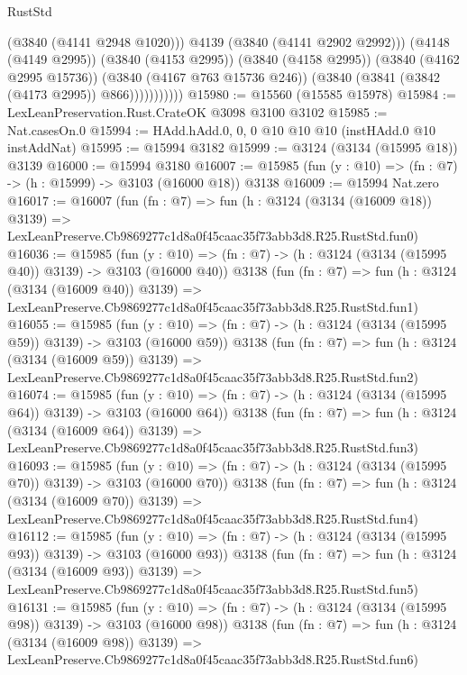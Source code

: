 \begin{lexlean}{RustStd}
\begin{coremodule}
                          (@3840 (@4141 @2948 @1020)))
                        @4139
                        (@3840 (@4141 @2902 @2992)))
                      (@4148 (@4149 @2995))
                      (@3840 (@4153 @2995))
                      (@3840 (@4158 @2995))
                      (@3840 (@4162 @2995 @15736))
                      (@3840 (@4167 @763 @15736 @246))
                      (@3840 (@3841 (@3842 (@4173 @2995)) @866)))))))))))
@15980 := @15560 (@15585 @15978)
@15984 := LexLeanPreservation.Rust.CrateOK @3098 @3100 @3102
@15985 := Nat.casesOn.{0}
@15994 := HAdd.hAdd.{0, 0, 0} @10 @10 @10 (instHAdd.{0} @10 instAddNat)
@15995 := @15994 @3182
@15999 := @3124 (@3134 (@15995 @18)) @3139
@16000 := @15994 @3180
@16007 := @15985 (fun (y : @10) => (fn : @7) -> (h : @15999) -> @3103 (@16000 @18)) @3138
@16009 := @15994 Nat.zero
@16017 := @16007
    (fun (fn : @7) =>
    fun (h : @3124 (@3134 (@16009 @18)) @3139) =>
    LexLeanPreserve.Cb9869277c1d8a0f45caac35f73abb3d8.R25.RustStd.fun0)
@16036 := @15985
    (fun (y : @10) => (fn : @7) -> (h : @3124 (@3134 (@15995 @40)) @3139) -> @3103 (@16000 @40))
    @3138
    (fun (fn : @7) =>
    fun (h : @3124 (@3134 (@16009 @40)) @3139) =>
    LexLeanPreserve.Cb9869277c1d8a0f45caac35f73abb3d8.R25.RustStd.fun1)
@16055 := @15985
    (fun (y : @10) => (fn : @7) -> (h : @3124 (@3134 (@15995 @59)) @3139) -> @3103 (@16000 @59))
    @3138
    (fun (fn : @7) =>
    fun (h : @3124 (@3134 (@16009 @59)) @3139) =>
    LexLeanPreserve.Cb9869277c1d8a0f45caac35f73abb3d8.R25.RustStd.fun2)
@16074 := @15985
    (fun (y : @10) => (fn : @7) -> (h : @3124 (@3134 (@15995 @64)) @3139) -> @3103 (@16000 @64))
    @3138
    (fun (fn : @7) =>
    fun (h : @3124 (@3134 (@16009 @64)) @3139) =>
    LexLeanPreserve.Cb9869277c1d8a0f45caac35f73abb3d8.R25.RustStd.fun3)
@16093 := @15985
    (fun (y : @10) => (fn : @7) -> (h : @3124 (@3134 (@15995 @70)) @3139) -> @3103 (@16000 @70))
    @3138
    (fun (fn : @7) =>
    fun (h : @3124 (@3134 (@16009 @70)) @3139) =>
    LexLeanPreserve.Cb9869277c1d8a0f45caac35f73abb3d8.R25.RustStd.fun4)
@16112 := @15985
    (fun (y : @10) => (fn : @7) -> (h : @3124 (@3134 (@15995 @93)) @3139) -> @3103 (@16000 @93))
    @3138
    (fun (fn : @7) =>
    fun (h : @3124 (@3134 (@16009 @93)) @3139) =>
    LexLeanPreserve.Cb9869277c1d8a0f45caac35f73abb3d8.R25.RustStd.fun5)
@16131 := @15985
    (fun (y : @10) => (fn : @7) -> (h : @3124 (@3134 (@15995 @98)) @3139) -> @3103 (@16000 @98))
    @3138
    (fun (fn : @7) =>
    fun (h : @3124 (@3134 (@16009 @98)) @3139) =>
    LexLeanPreserve.Cb9869277c1d8a0f45caac35f73abb3d8.R25.RustStd.fun6)

\end{coremodule}
\end{lexlean}
